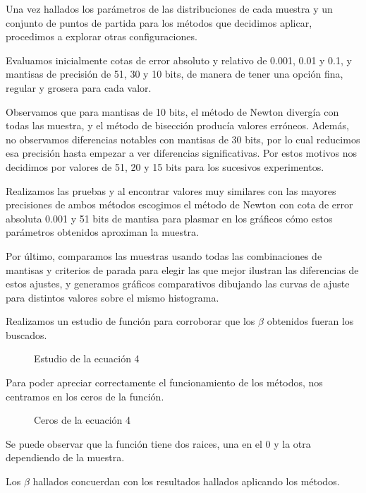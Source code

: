 \documentclass[a4paper,10pt,twoside]{article}
\begin{document}
Una vez hallados los parámetros de las distribuciones de cada muestra y un
conjunto de puntos de partida para los métodos que decidimos aplicar,
procedimos a explorar otras configuraciones. 

Evaluamos inicialmente cotas de error absoluto y relativo de 0.001, 0.01 y 0.1, y mantisas
de precisión de 51, 30 y 10 bits, de manera de tener una opción fina, regular y
grosera para cada valor.

Observamos que para mantisas de 10 bits, el método de Newton divergía con todas
las muestra, y el método de bisección producía valores erróneos. Además,
no observamos diferencias notables con mantisas de 30 bits, por lo cual reducimos
esa precisión hasta empezar a ver diferencias significativas. Por estos motivos
nos decidimos por valores de 51, 20 y 15 bits para los sucesivos experimentos.

Realizamos las pruebas y al encontrar valores muy similares con las mayores precisiones
de ambos métodos escogimos el método de Newton con cota de error absoluta 0.001 y 51 bits de mantisa
para plasmar en los gráficos cómo estos parámetros obtenidos aproximan la muestra.

Por último, comparamos las muestras usando todas las combinaciones de mantisas y criterios
de parada para elegir las que mejor ilustran las diferencias de estos ajustes, y
generamos gráficos comparativos dibujando las curvas de ajuste para distintos valores
sobre el mismo histograma.

Realizamos un estudio de función para corroborar que los $\beta$ obtenidos fueran los buscados.

\begin{figure}[H]
  \centering
  \caption{Estudio de la ecuación 4}
  
\end{figure}

Para poder apreciar correctamente el funcionamiento de los métodos, nos centramos en los ceros de la función.

\begin{figure}[H]
  \centering
  \caption{Ceros de la ecuación 4}
  
\end{figure}

Se puede observar que la función tiene dos raices, una en el 0 y la otra dependiendo de la muestra. 

Los $\beta$ hallados concuerdan con los resultados hallados aplicando los métodos.


\end{document}
